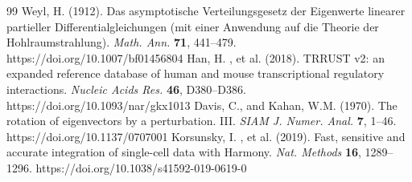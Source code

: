 \documentclass[11 pt,a4 paper]{article}
\begin{document}
\begin{thebibliography}{99}
 Weyl, H. (1912). Das asymptotische Verteilungsgesetz der Eigenwerte linearer partieller Differentialgleichungen (mit einer Anwendung auf die Theorie der Hohlraumstrahlung). \textit{Math. Ann.} \textbf{71}, 441--479. https://doi.org/10.1007/bf01456804
 Han, H. , et al. (2018). TRRUST v2: an expanded reference database of human and mouse transcriptional regulatory interactions. \textit{Nucleic Acids Res.} \textbf{46}, D380--D386. https://doi.org/10.1093/nar/gkx1013
 Davis, C., and Kahan, W.M. (1970). The rotation of eigenvectors by a perturbation. III. \textit{SIAM J. Numer. Anal.} \textbf{7}, 1--46. https://doi.org/10.1137/0707001
 Korsunsky, I. , et al. (2019). Fast, sensitive and accurate integration of single-cell data with Harmony. \textit{Nat. Methods} \textbf{16}, 1289--1296. https://doi.org/10.1038/s41592-019-0619-0
\end{thebibliography}
\end{document}
